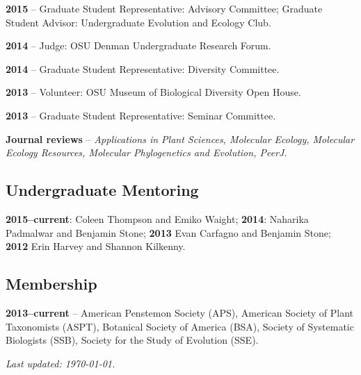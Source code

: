 \documentclass[]{article}
\begin{document}
\textbf{2015} -- Graduate Student Representative: Advisory Committee; Graduate Student Advisor: Undergraduate Evolution and Ecology Club.

\textbf{2014} -- Judge: OSU Denman Undergraduate Research Forum.

\textbf{2014} -- Graduate Student Representative: Diversity Committee.

\textbf{2013} -- Volunteer: OSU Museum of Biological Diversity Open House.

\textbf{2013} -- Graduate Student Representative: Seminar Committee.

\textbf{Journal reviews} -- \emph{Applications in Plant Sciences, Molecular Ecology, Molecular Ecology Resources, Molecular Phylogenetics and
Evolution, PeerJ}.

\subsection{\texorpdfstring{\textbf{Undergraduate Mentoring}}{Undergraduate Mentoring}}\label{undergraduate-mentoring}

\textbf{2015--current}: Coleen Thompson and Emiko Waight; \textbf{2014}: Naharika Padmalwar and Benjamin Stone; \textbf{2013} Evan Carfagno and Benjamin Stone; \textbf{2012} Erin Harvey and Shannon Kilkenny.

\subsection{\texorpdfstring{\textbf{Membership}}{Membership}}\label{membership}

\textbf{2013--current} -- American Penstemon Society (APS), American
Society of Plant Taxonomists (ASPT), Botanical Society of America (BSA),
Society of Systematic Biologists (SSB), Society for the Study of
Evolution (SSE).

\vspace{0.25in}
\hfill {\small \itshape Last updated: \mydate\today.}
\end{document}
